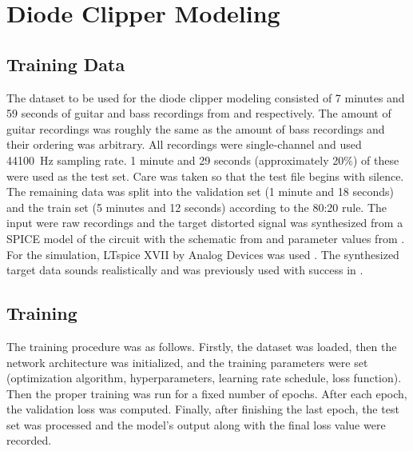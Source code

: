 
\section{Diode Clipper Modeling}
\label{chap:diode_clipper}



\subsection{Training Data}
\label{sec:diode_clipper_training_data}

The dataset to be used for the diode clipper modeling consisted of 7 minutes and 59 seconds of guitar and bass recordings from \cite{Abesser2013} and \cite{Kehling2014} respectively. The amount of guitar recordings was roughly the same as the amount of bass recordings and their ordering was arbitrary. All recordings were single-channel and used \SI{44100}{Hz} sampling rate. 1 minute and 29 seconds (approximately 20\%) of these were used as the test set. Care was taken so that the test file begins with silence. The remaining data was split into the validation set (1 minute and 18 seconds) and the train set (5 minutes and 12 seconds) according to the 80:20 rule. The input were raw recordings and the target distorted signal was synthesized from a SPICE model of the circuit with the schematic from  and parameter values from . For the simulation, LTspice XVII by Analog Devices was used \cite{LTspice}. The synthesized target data sounds realistically and was previously used with success in \cite{Wright2019}.

\subsection{Training}
\label{sec:diode_clipper_training}

The training procedure was as follows. Firstly, the dataset was loaded, then the network architecture was initialized, and the training parameters were set (optimization algorithm, hyperparameters, learning rate schedule, loss function). Then the proper training was run for a fixed number of epochs. After each epoch, the validation loss was computed. Finally, after finishing the last epoch, the test set was processed and the model's output along with the final loss value were recorded.

